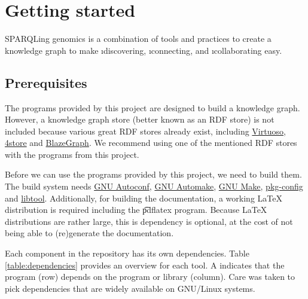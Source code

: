 \chapter{Getting started}

  SPARQLing genomics is a combination of tools and practices to create a
  knowledge graph to make \i{discovering}, \i{connecting}, and
  \i{collaborating} easy.

\section{Prerequisites}
\label{sec:prerequisites}

  The programs provided by this project are designed to build a knowledge graph.
  However, a knowledge graph store (better known as an RDF store) is not included
  because various great RDF stores already exist, including
  \href{https://virtuoso.openlinksw.com/}{Virtuoso},
  \href{https://github.com/4store/4store}{4store} and
  \href{https://www.blazegraph.com/}{BlazeGraph}.  We recommend using one of
  the mentioned RDF stores with the programs from this project.

  Before we can use the programs provided by this project, we need to build
  them.  The build system needs
  \href{https://www.gnu.org/software/autoconf}{GNU Autoconf},
  \href{https://www.gnu.org/software/automake}{GNU Automake},
  \href{https://www.gnu.org/software/make}{GNU Make},
  \href{https://www.freedesktop.org/wiki/Software/pkg-config/}{pkg-config} and
  \href{https://www.gnu.org/software/libtool/}{libtool}.
  Additionally, for building the documentation, a working \LaTeX{} distribution is
  required including the \t{pdflatex} program.  Because \LaTeX{} distributions
  are rather large, this is dependency is optional, at the cost of not being able
  to (re)generate the documentation.

  Each component in the repository has its own dependencies.  Table
  \ref{table:dependencies} provides an overview for each tool.  A \B{}
  indicates that the program (row) depends on the program or library (column).
  Care was taken to pick dependencies that are widely available on GNU/Linux
  systems.

